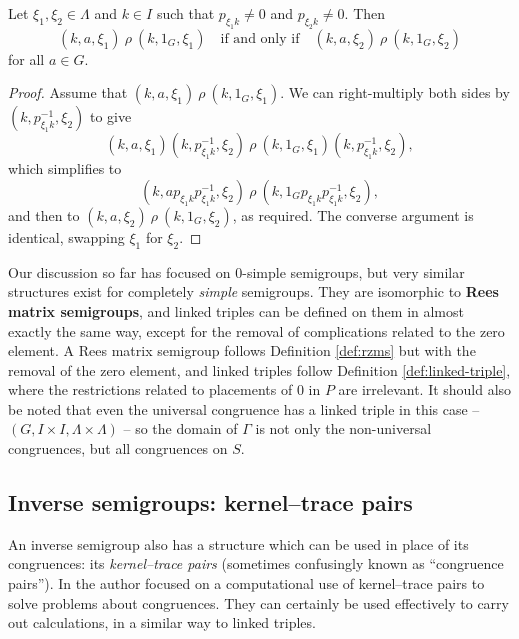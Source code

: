 \begin{lemma}
  Let $\xi_1, \xi_2 \in \Lambda$ and $k \in I$ such that $p_{\xi_1k}^{} \neq 0$
  and $p_{\xi_2 k}^{} \neq 0$.  Then
  $$(k, a, \xi_1) ~\rho~ (k, 1_G, \xi_1)
  \quad \text{if and only if} \quad
  (k, a, \xi_2) ~\rho~ (k, 1_G, \xi_2)$$
  for all $a \in G$.
  \begin{proof}
    Assume that $(k, a, \xi_1) ~\rho~ (k, 1_G, \xi_1)$.  We can right-multiply
    both sides by $(k, p_{\xi_1k}^{-1}, \xi_2)$ to give
    $$(k, a, \xi_1)(k, p_{\xi_1k}^{-1}, \xi_2)
    ~\rho~ (k, 1_G, \xi_1)(k, p_{\xi_1k}^{-1}, \xi_2),$$
    which simplifies to
    $$(k, a p_{\xi_1k}^{} p_{\xi_1k}^{-1}, \xi_2)
    ~\rho~ (k, 1_G p_{\xi_1k}^{} p_{\xi_1k}^{-1}, \xi_2),$$
    and then to
    $(k, a, \xi_2) ~\rho~ (k, 1_G, \xi_2)$,
    as required.
    The converse argument is identical, swapping $\xi_1$ for $\xi_2$.
  \end{proof}
\end{lemma}

Our discussion so far has focused on 0-simple semigroups, but very similar
structures exist for completely \textit{simple} semigroups.  They are isomorphic
to \textbf{Rees matrix semigroups}, and linked triples can be defined on them in
almost exactly the same way, except for the removal of complications related to
the zero element.  A Rees matrix semigroup follows Definition \ref{def:rzms} but
with the removal of the zero element, and linked triples follow Definition
\ref{def:linked-triple}, where the restrictions related to placements of $0$ in
$P$ are irrelevant.  It should also be noted that even the universal congruence
has a linked triple in this
case -- $(G, I \times I, \Lambda \times \Lambda)$ -- so the domain of $\Gamma$ is
not only the non-universal congruences, but all congruences on $S$.

\subsection{Inverse semigroups: kernel--trace pairs}
\label{sec:kertr}

An inverse semigroup also has a structure which can be used in place of its
congruences: its \textit{kernel--trace pairs} (sometimes confusingly known as
``congruence pairs'').  In \cite[Chapter 5]{mtorpey_msc} the author focused on a
computational use of kernel--trace pairs to solve problems about congruences.
They can certainly be used effectively to carry out calculations, in a similar
way to linked triples.

